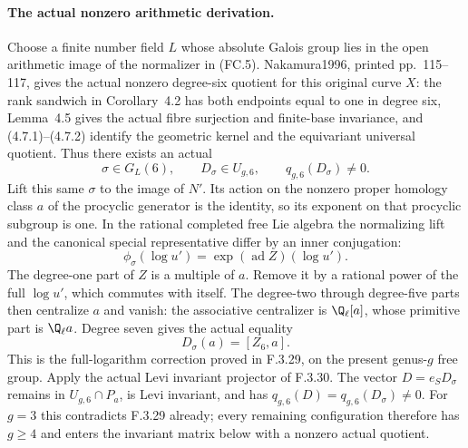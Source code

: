 \paragraph{The actual nonzero arithmetic derivation.}
Choose a finite number field $L$ whose absolute Galois
group lies in the open arithmetic image of the
normalizer in (FC.5). Nakamura1996, printed
pp.~115--117\cite{AuditNakamura1996}, gives the actual nonzero degree-six
quotient for this original curve $X$: the rank
sandwich in Corollary~4.2 has both endpoints equal
to one in degree six, Lemma~4.5 gives the actual
fibre surjection and finite-base invariance, and
(4.7.1)--(4.7.2) identify the geometric kernel and
the equivariant universal quotient. Thus there
exists an actual
\[
 \sigma\in G_L(6),\qquad D_\sigma\in U_{g,6},
                           \qquad q_{g,6}(D_\sigma)\ne0.
                                                               \tag{FC.5a}
\]
Lift this same $\sigma$ to the image of $N'$.
Its action on the nonzero proper homology class
$a$ of the procyclic generator is the identity,
so its exponent on that procyclic subgroup is
one. In the rational completed free Lie algebra
the normalizing lift and the canonical special
representative differ by an inner conjugation:
\[
       \phi_\sigma(\log u')
                    =\exp(\operatorname{ad}Z)(\log u').
\]
The degree-one part of $Z$ is a multiple of $a$.
Remove it by a rational power of the full
$\log u'$, which commutes with itself. The
degree-two through degree-five parts then
centralize $a$ and vanish: the associative
centralizer is $\Q_\ell[a]$, whose primitive
part is $\Q_\ell a$. Degree seven gives the
actual equality
\[
                         D_\sigma(a)=[Z_6,a].               \tag{FC.5b}
\]
This is the full-logarithm correction proved
in F.3.29, on the present genus-$g$ free group.
Apply the actual Levi invariant projector
of F.3.30. The vector
$D=e_S D_\sigma$ remains in $U_{g,6}\cap P_a$,
is Levi invariant, and has
$q_{g,6}(D)=q_{g,6}(D_\sigma)\ne0$.
For $g=3$ this contradicts F.3.29 already;
every remaining configuration therefore has
$g\geq4$ and enters the invariant matrix
below with a nonzero actual quotient.

